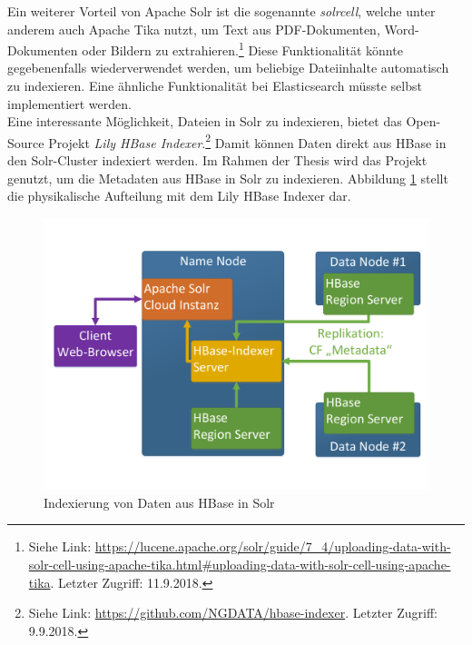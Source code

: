 \noindent
Ein weiterer Vorteil von Apache Solr ist die sogenannte \textit{\gls{solrcell}}, welche unter anderem auch Apache Tika nutzt, um Text aus PDF-Dokumenten, Word-Dokumenten oder Bildern zu extrahieren.\footnote{Siehe Link: \url{https://lucene.apache.org/solr/guide/7_4/uploading-data-with-solr-cell-using-apache-tika.html\#uploading-data-with-solr-cell-using-apache-tika}. Letzter Zugriff: 11.9.2018.} Diese Funktionalität könnte gegebenenfalls wiederverwendet werden, um beliebige Dateiinhalte automatisch zu indexieren. Eine ähnliche Funktionalität bei Elasticsearch müsste selbst implementiert werden.\\

\noindent
Eine interessante Möglichkeit, Dateien in Solr zu indexieren, bietet das Open-Source Projekt \textit{Lily HBase Indexer}.\footnote{Siehe Link: \url{https://github.com/NGDATA/hbase-indexer}. Letzter Zugriff: 9.9.2018.} Damit können Daten direkt aus HBase in den Solr-Cluster indexiert werden. 
Im Rahmen der Thesis wird das Projekt genutzt, um die Metadaten aus HBase in Solr zu indexieren. Abbildung \ref{fig:hbase_solr_indexing} stellt die physikalische Aufteilung mit dem Lily HBase Indexer dar.\\
\begin{figure}[ht]
  \centering
  \includegraphics[width=\textwidth]{./resource/hbase_solr_indexierung.pdf}
  \caption{Indexierung von Daten aus HBase in Solr}
  \label{fig:hbase_solr_indexing}
\end{figure}


